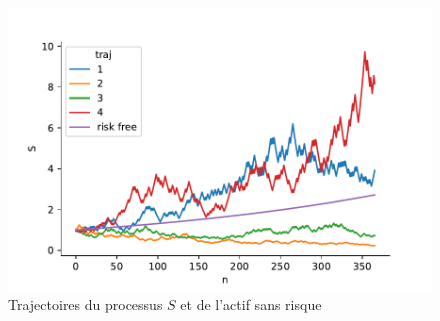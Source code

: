 \begin{figure}
\centering
\includegraphics[width = \textwidth]{../Figures/traj_CRR.pdf}
\caption{Trajectoires du processus $S$ et de l'actif sans risque}
\label{fig:traj_CRR}
\end{figure}

